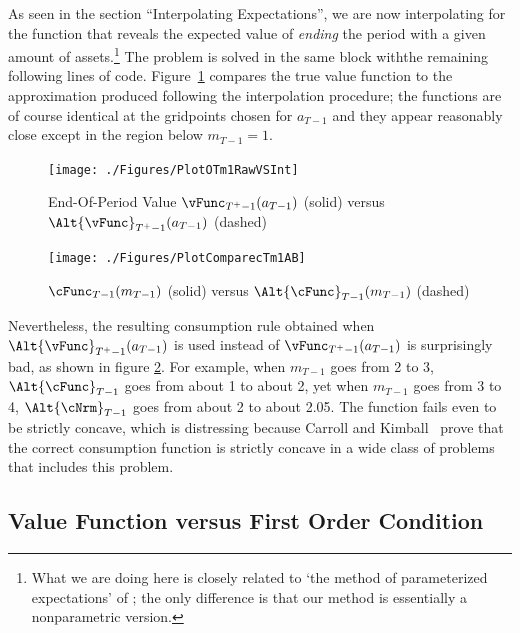 \documentclass[titlepage, headings=optiontotocandhead]{\econtex}
\begin{document}
As seen in the section ``Interpolating Expectations'', we are now interpolating for the function 
that reveals the expected value of \textit{ending} the period with a given amount
of assets.\footnote{What we are doing here is closely related to `the
  method of parameterized expectations' of
  \cite{denHaanMarcet:parameterized}; the only difference is that our
  method is essentially a nonparametric version.}  The problem is solved in the same block withthe remaining following lines of code. Figure~\ref{fig:PlotOTm1RawVSInt}
compares the true value function to the
approximation produced following the interpolation procedure; the functions are of course
identical at the gridpoints chosen for ${a}_{T-1}$ and they appear
reasonably close except in the region below
${m}_{T-1}=1$.

\hypertarget{PlotOTm1RawVSInt}{}
\begin{figure}
  \centerline{\texttt{[image: ./Figures/PlotOTm1RawVSInt]}}
  \caption{End-Of-Period Value $\vFunc_{T^{+}-1}({a}_{T-1})$ (solid) versus $\Alt{\vFunc}_{T^{+}-1}({a}_{T-1})$ (dashed)}
  \label{fig:PlotOTm1RawVSInt}
\end{figure}

\hypertarget{PlotComparecTm1AB}{}
\begin{figure}
  \centerline{\texttt{[image: ./Figures/PlotComparecTm1AB]}}
  \caption{$\cFunc_{T-1}({m}_{T-1})$ (solid) versus $\Alt{\cFunc}_{T-1}({m}_{T-1})$ (dashed)}
  \label{fig:PlotComparecTm1AB}
\end{figure}

Nevertheless, the resulting consumption rule obtained when $\Alt{\vFunc}_{T^{+}-1}({a}_{T-1})$
is used
instead of $\vFunc_{T^{+}-1}({a}_{T-1})$ is surprisingly bad, as
shown in figure \ref{fig:PlotComparecTm1AB}.  For example, when
${m}_{T-1}$ goes from 2 to 3, $\Alt{\cFunc}_{T-1}$ goes from about 1
to about 2, yet when ${m}_{T-1}$ goes from 3 to 4, $\Alt{\cNrm}_{T-1}$
goes from about 2 to about 2.05.  The function fails even to be
strictly concave, which is distressing because Carroll and
Kimball~\citeyearpar{ckConcavity} prove that the correct
consumption function is strictly concave in a wide class of problems that
includes this problem.

\hypertarget{Value-Function-versus-First-Order-Condition}{}
\subsection{Value Function versus First Order Condition}\label{subsec:vVsuP}
\end{document}
